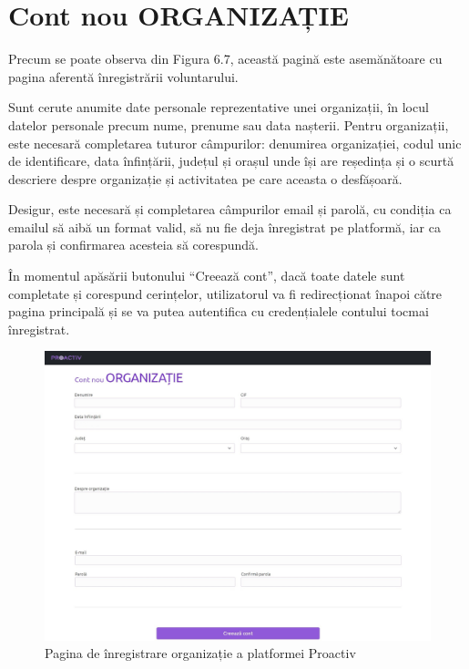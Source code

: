\documentclass[12pt,a4paper]{report}
\begin{document}
\section{Cont nou ORGANIZAȚIE}
\par
Precum se poate observa din Figura 6.7, această pagină este asemănătoare cu pagina aferentă înregistrării voluntarului.
\\\par
Sunt cerute anumite date personale reprezentative unei organizații, în locul datelor personale precum nume, prenume sau data nașterii. Pentru organizații, este necesară completarea tuturor câmpurilor: denumirea organizației, codul unic de identificare, data înfințării, județul și orașul unde își are reședința și o scurtă descriere despre organizație și activitatea pe care aceasta o desfășoară.
\\\par
Desigur, este necesară și completarea câmpurilor email și parolă, cu condiția ca emailul să aibă un format valid, să nu fie deja înregistrat pe platformă, iar ca parola și confirmarea acesteia să corespundă.
\\\par
În momentul apăsării butonului “Creează cont”, dacă toate datele sunt completate și corespund cerințelor, utilizatorul va fi redirecționat înapoi către pagina principală și se va putea autentifica cu credențialele contului tocmai înregistrat.
\\
\begin{figure}[H]
\centering
  \includegraphics[width=1\linewidth]{./imagini/contorg.jpg}
  \caption{Pagina de înregistrare organizație a platformei Proactiv}
\end{figure}
\end{document}
